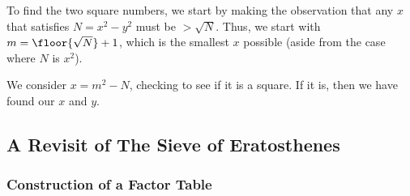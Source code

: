 \documentclass{article}
\begin{document}
\par To find the two square numbers, we start by making the observation that any $x$ that satisfies $N=x^2-y^2$ 
must be $> \sqrt{N}$. Thus, we start with $m=\floor{\sqrt{N}}+1$, which is the smallest $x$ possible (aside
from the case where $N$ is $x^2$).

\par We consider $x=m^2-N$, checking to see if it is a square. If it is, then we have found our $x$ and $y$.

\subsection{A Revisit of The Sieve of Eratosthenes}

\subsubsection {Construction of a Factor Table}
	


\end{document}
